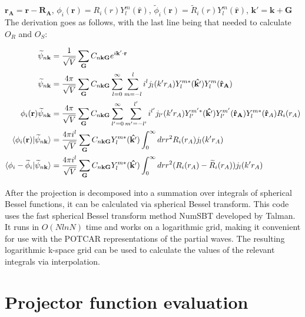 \documentclass[12pt]{article}
\begin{document}
$\mathbf{r_A} = \mathbf{r} - \mathbf{R_A}$, $\phi_i(\mathbf{r})=R_i(r)Y_l^m(\mathbf{\hat{r}})$,
$\widetilde{\phi}_i(\mathbf{r})=\widetilde{R}_i(r)Y_l^m(\mathbf{\hat{r}})$,
$\mathbf{k'}=\mathbf{k}+\mathbf{G}$\\
The derivation goes as follows, with the last line being that needed to 
calculate $O_R$ and $O_S$:

\begin{equation}
\begin{split}
\widetilde{\psi}_{n\mathbf{k}} & =\frac{1}{\sqrt{V}}\sum_{\mathbf{G}}
C_{n\mathbf{k}\mathbf{G}}e^{i\mathbf{k'}\cdot \mathbf{r}}\\
\widetilde{\psi}_{n\mathbf{k}} & =\frac{4\pi}{\sqrt{V}}\sum_{\mathbf{G}}
C_{n\mathbf{k}\mathbf{G}}\sum_{l=0}^{\infty}\sum_{m=-l}^{l}
i^l j_l(k'r_A)Y_l^{m*}(\mathbf{\hat{k'}})Y_l^m(\mathbf{\hat{r}_A})\\
\phi_i(\mathbf{r})\widetilde{\psi}_{n\mathbf{k}} & =\frac{4\pi}{\sqrt{V}}\sum_{\mathbf{G}}
C_{n\mathbf{k}\mathbf{G}}\sum_{l'=0}^{\infty}\sum_{m'=-l'}^{l'}
i^{l'} j_{l'}(k'r_A)Y_{l'}^{m'*}(\mathbf{\hat{k'}})Y_{l'}^{m'}(\mathbf{\hat{r}_A})
Y_l^{m*}(\mathbf{\hat{r}}_A)R_i(r_A)\\
\braket{\phi_i(\mathbf{r})|\widetilde{\psi}_{n\mathbf{k}}} & =
\frac{4\pi i^l}{\sqrt{V}}\sum_{\mathbf{G}} C_{n\mathbf{k}\mathbf{G}}
Y_l^{m*}(\mathbf{\hat{k'}})\int_0^{\infty}drr^2R_i(r_A)j_l(k'r_A)\\
\braket{\phi_i-\widetilde{\phi}_i|\widetilde{\psi}_{n\mathbf{k}}} & =
\frac{4\pi i^l}{\sqrt{V}}\sum_{\mathbf{G}} C_{n\mathbf{k}\mathbf{G}}
Y_l^{m*}(\mathbf{\hat{k'}})\int_0^{\infty}drr^2(R_i(r_A)-\widetilde{R}_i(r_A))j_l(k'r_A)
\end{split}
\end{equation}

After the projection is decomposed into a summation over integrals of spherical
Bessel functions, it can be calculated via spherical Bessel transform. This code
uses the fast spherical Bessel transform method NumSBT developed by Talman.\cite{TALMAN}
It runs in $O(NlnN)$ time and works on a logarithmic grid, making it convenient for use with
the POTCAR representations of the partial waves. The resulting logarithmic k-space
grid can be used to calculate the values of the relevant integrals via interpolation.

\section{Projector function evaluation}
\end{document}
